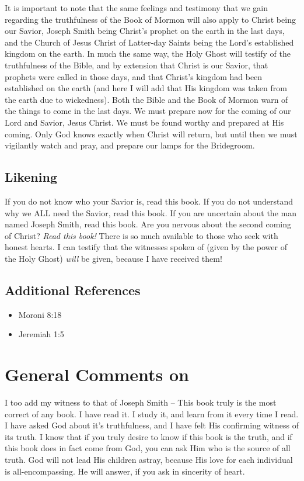 \documentclass[12pt]{report}
\begin{document}
It is important to note that the same feelings and testimony that we gain regarding the truthfulness of the Book of Mormon will also apply to Christ being our Savior, Joseph Smith being Christ's prophet on the earth in the last days, and the Church of Jesus Christ of Latter-day Saints being the Lord's established kingdom on the earth.  In much the same way, the Holy Ghost will testify of the truthfulness of the Bible, and by extension that Christ is our Savior, that prophets were called in those days, and that Christ's kingdom had been established on the earth (and here I will add that His kingdom was taken from the earth due to wickedness).  Both the Bible and the Book of Mormon warn of the things to come in the last days.  We must prepare now for the coming of our Lord and Savior, Jesus Christ.  We must be found worthy and prepared at His coming.  Only God knows exactly when Christ will return, but until then we must vigilantly watch and pray, and prepare our lamps for the Bridegroom.

\subsection{Likening\label{intro:likening9}}
If you do not know who your Savior is, read this book.  If you do not understand why we ALL need the Savior, read this book.  If you are uncertain about the man named Joseph Smith, read this book.  Are you nervous about the second coming of Christ?  \emph{Read this book!} There is so much available to those who seek with honest hearts.  I can testify that the witnesses spoken of (given by the power of the Holy Ghost) \emph{will} be given, because I have received them!

\subsection{Additional References\label{intro:references9}}
\begin{itemize}
\item Moroni 8:18
\item Jeremiah 1:5
\end{itemize}

\section{General Comments on }
I too add my witness to that of Joseph Smith -- This book truly is the most correct of any book.  I have read it.  I study it, and learn from it every time I read.  I have asked God about it's truthfulness, and I have felt His confirming witness of its truth.  I know that if you truly desire to know if this book is the truth, and if this book does in fact come from God, you can ask Him who is the source of all truth.  God will not lead His children astray, because His love for each individual is all-encompassing.  He will answer, if you ask in sincerity of heart.
\end{document}
